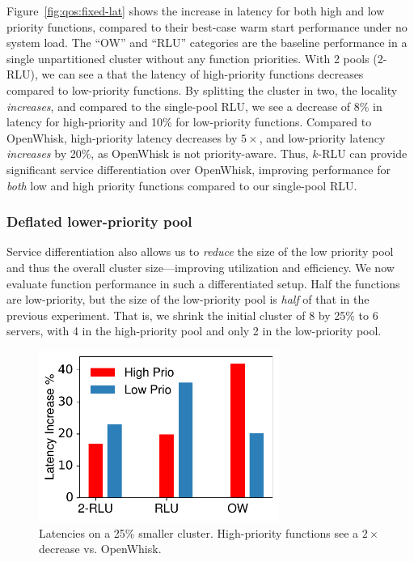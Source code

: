 Figure~\ref{fig:qos:fixed-lat} shows the increase in latency for both high and low priority functions, compared to their best-case warm start performance under no system load.
The ``OW'' and ``RLU'' categories are the baseline performance in a single unpartitioned cluster without any function priorities.  
With 2 pools (2-RLU), we can see a that the latency of high-priority functions decreases compared to low-priority functions. 
By splitting the cluster in two, the locality \emph{increases}, and compared to the single-pool RLU, we see a decrease of 8\% in latency for high-priority and 10\% for low-priority functions. 
Compared to OpenWhisk, high-priority latency decreases by $5\times$, and low-priority latency \emph{increases} by 20\%, as OpenWhisk is not priority-aware.
Thus, $k$-RLU can provide significant service differentiation over OpenWhisk, improving performance for \emph{both} low and high priority functions compared to our single-pool RLU.


\subsubsection{Deflated lower-priority pool}

Service differentiation also allows us to \emph{reduce} the size of the low priority pool and thus the overall cluster size---improving utilization and efficiency.
We now evaluate function performance in such a differentiated setup.
Half the functions are low-priority, but the size of the low-priority pool is \emph{half} of that in the previous experiment.
That is, we shrink the initial cluster of 8 by 25\% to 6 servers, with 4 in the high-priority pool and only 2 in the low-priority pool.

\begin{figure}
  \centering \includegraphics[width=0.7\textwidth]{chrlu/qos/Figures/fixed/qos2.pdf} %
  \caption{Latencies on a 25\% smaller cluster. High-priority functions see a $2\times$ decrease vs. OpenWhisk.}
  \label{fig:qos:shrunk-lat}
\end{figure}

